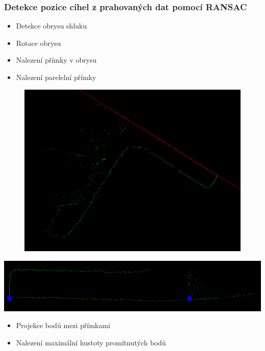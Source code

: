 \begin{frame}
    \frametitle{Detekce pozice cihel z prahovaných dat pomocí RANSAC}
    \begin{minipage}{0.40\textwidth}
    \begin{itemize}
        \item Detekce obrysu shluku
        \item Rotace obrysu 
        \item Nalezení přímky v obrysu
        \item Nalezení parelelní přímky
    \end{itemize}
    \end{minipage}
    \begin{minipage}{0.59\textwidth}
    \begin{figure}
        \centering
        \includegraphics[width = \linewidth]{ransac_rect_fit1.png}
    \end{figure}
    \end{minipage}
    \begin{minipage}{0.59\textwidth}
        \includegraphics[width = \linewidth]{ransac_rec_fit_3_crop.png}
    \end{minipage}
    \begin{minipage}{0.40\textwidth}
    \begin{itemize}
        \item Projekce bodů mezi přímkami
        \item Nalezení maximální hustoty promítnutých bodů
    \end{itemize}
    \end{minipage}
\end{frame}

